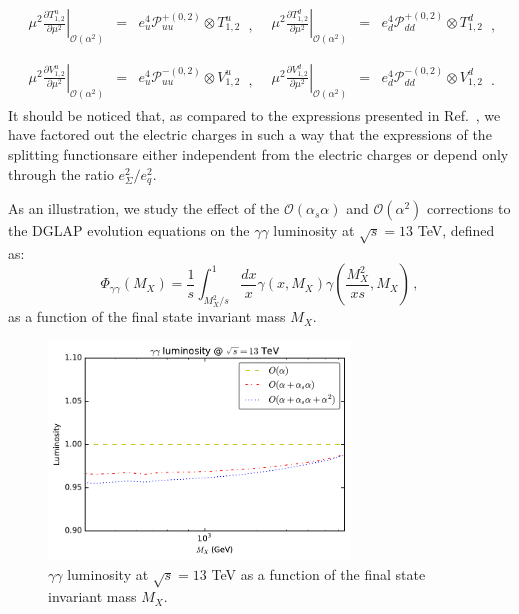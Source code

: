 \begin{equation}
\begin{array}{ll}
\begin{array}{rcl}
\displaystyle \left.\mu^2\frac{\partial T^u_{1,2}}{\partial \mu^2}\right|_{\mathcal{O}(\alpha^2)} &=&
\displaystyle e_u^4\mathcal{P}_{uu}^{+(0,2)}\otimes T^u_{1,2}
\end{array}\,, &
\begin{array}{rcl}
\displaystyle \left.\mu^2\frac{\partial T^d_{1,2}}{\partial \mu^2}\right|_{\mathcal{O}(\alpha^2)} &=&
\displaystyle e_d^4\mathcal{P}_{dd}^{+(0,2)} \otimes T^d_{1,2}
\end{array}\,,
\\
\\
\begin{array}{rcl}
\displaystyle \left.\mu^2\frac{\partial V^u_{1,2}}{\partial \mu^2}\right|_{\mathcal{O}(\alpha^2)} &=&
\displaystyle e_u^4\mathcal{P}_{uu}^{-(0,2)} \otimes V^u_{1,2}
\end{array}\,, &
\begin{array}{rcl}
\displaystyle \left.\mu^2\frac{\partial V^d_{1,2}}{\partial \mu^2}\right|_{\mathcal{O}(\alpha^2)} &=&
\displaystyle e_d^4\mathcal{P}_{dd}^{-(0,2)}\otimes V^d_{1,2}
\end{array}\,.
\end{array}
\end{equation}
It should be noticed that, as compared to the expressions presented in
Ref.~\cite{deFlorian:2016gvk}, we have factored out the electric
charges in such a way that the expressions of the splitting
functionsare either independent from the electric charges or depend
only through the ratio $e_\Sigma^2/e_q^2$.

As an illustration, we study the effect of the
$\mathcal{O}(\alpha_s\alpha)$ and $\mathcal{O}(\alpha^2)$ corrections
to the DGLAP evolution equations on the $\gamma\gamma$ luminosity at
$\sqrt{s} = 13$ TeV, defined as:
\begin{equation}\label{eq:GammaGammaLumi}
\Phi_{\gamma\gamma}(M_X) = \frac1{s}\int_{M_X^2/s}^1
\frac{dx}{x} \gamma(x,M_X) \gamma\left(\frac{M_X^2}{xs},M_X\right)\,,
\end{equation}
as a function of the final state invariant mass $M_X$.
\begin{figure}[h]
\includegraphics[width=8cm]{figs/lumi_13tev.pdf} 
\caption{$\gamma\gamma$ luminosity at $\sqrt{s} = 13$ TeV as a
  function of the final state invariant mass $M_X$.}
\label{fig:GammaGammaLumi}
\end{figure}

